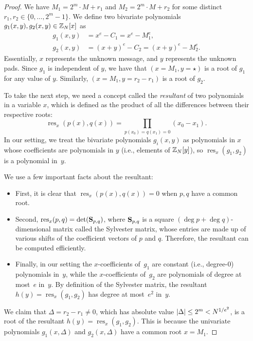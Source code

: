 \documentclass[11pt]{article}
\DeclareMathOperator{\res}{res}
\begin{document}
\begin{proof}
  We have $M_1 = 2^{m}\cdot M+r_1$ and $M_2=2^{m}\cdot M+r_2$ for some
  distinct $r_1,r_2 \in \{0,\ldots, 2^{m}-1\}$.  We define two
  bivariate polynomials $g_{1}(x,y), g_{2}(x,y) \in \mathbb{Z}_{N}[x]$ as
  \begin{align}
    g_1(x,y) &= x^{e} - C_1 = x^{e}-M_1^{e}, \\
    g_2(x,y) &= (x+y)^{e}-C_2=(x+y)^{e}-M_2^{e} .
  \end{align}
  Essentially, $x$ represents the unknown message, and $y$ represents
  the unknown pads. Since $g_1$ is independent of $y$, we have that
  $(x=M_1, y = \star)$ is a root of $g_1$ for any value of $y$.
  Similarly, $(x=M_{1}, y=r_2-r_1)$ is a root of $g_2$.

  To take the next step, we need a concept called the \emph{resultant}
  of two polynomials in a variable $x$, which is defined as the
  product of all the differences between their respective roots:
  \[ \res_x(p(x),q(x))=\prod_{p(x_0)=q(x_1)=0}(x_0-x_1). \] In our
  setting, we treat the bivariate polynomials $g_{i}(x,y)$ as
  polynomials in $x$ whose coefficients are polynomials in $y$ (i.e.,
  elements of $\mathbb{Z}_{N}[y]$), so $\res_{x}(g_{1}, g_{2})$ is a
  polynomial in~$y$.

  We use a few important facts about the resultant:
  \begin{itemize}[itemsep=0pt]
  \item First, it is clear that $\res_x(p(x),q(x))=0$ when $p,q$ have
    a common root.
  \item Second, $\res_x(p,q)=\det(\matS_{p,q})$, where $\mathbf{S}_{p,q}$
    is a square $(\deg{p}+\deg{q})$-dimensional matrix called the
    Sylvester matrix, whose entries are made up of various shifts of
    the coefficient vectors of $p$ and $q$. Therefore, the resultant
    can be computed efficiently.
  \item Finally, in our setting the $x$-coefficients of~$g_{1}$ are
    constant (i.e., degree-$0$) polynomials in~$y$, while the
    $x$-coefficients of~$g_{2}$ are polynomials of degree at most~$e$
    in~$y$. By definition of the Sylvester matrix, the resultant
    $h(y) = \res_{x}(g_{1}, g_{2})$ has degree at most~$e^{2}$ in~$y$.
  \end{itemize}

  We claim that $\Delta=r_2-r_1 \neq 0$, which has absolute value
  $\lvert\Delta\rvert \leq 2^{m} < N^{1/e^{2}}$, is a root of the resultant
  $h(y)=\res_x(g_1,g_2)$. This is because the univariate polynomials
  $g_1(x,\Delta)$ and $g_2(x,\Delta)$ have a common root $x=M_{1}$.


\end{proof}
\end{document}
